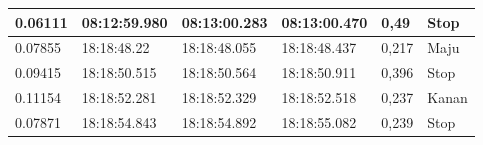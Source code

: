 \begin{longtable}{|l|l|l|l|l|l|}
  0.06111                                                                                                 & 08:12:59.980                                                                                           & 08:13:00.283                                                                                               & 08:13:00.470                                                                                            & 0,49                                               & Stop                                              \\ \hline
  0.07855                                                                                                 & 18:18:48.22                                                                                            & 18:18:48.055                                                                                               & 18:18:48.437                                                                                            & 0,217                                              & Maju                                              \\ \hline
  0.09415                                                                                                 & 18:18:50.515                                                                                           & 18:18:50.564                                                                                               & 18:18:50.911                                                                                            & 0,396                                              & Stop                                              \\ \hline
  0.11154                                                                                                 & 18:18:52.281                                                                                           & 18:18:52.329                                                                                               & 18:18:52.518                                                                                            & 0,237                                              & Kanan                                             \\ \hline
  0.07871                                                                                                 & 18:18:54.843                                                                                           & 18:18:54.892                                                                                               & 18:18:55.082                                                                                            & 0,239                                              & Stop                                              \\ \hline

\end{longtable}
